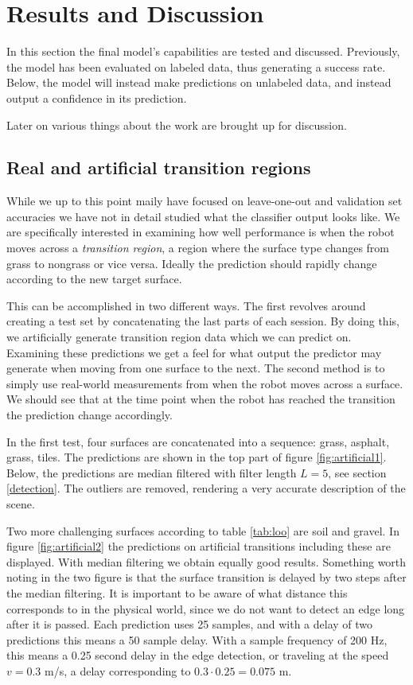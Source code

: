 \chapter{Results and Discussion}
In this section the final model's capabilities are tested and discussed. Previously, the model has been evaluated on labeled data, thus generating a success rate. Below, the model will instead make predictions on unlabeled data, and instead output a confidence in its prediction.

Later on various things about the work are brought up for discussion.

\section{Real and artificial transition regions}

While we up to this point maily have focused on leave-one-out and validation set accuracies we have not in detail studied what the classifier output looks like. We are specifically interested in examining how well performance is when the robot moves across a \emph{transition region}, a region where the surface type changes from grass to nongrass or vice versa. Ideally the prediction should rapidly change according to the new target surface. 

This can be accomplished in two different ways. The first revolves around creating a test set by concatenating the last parts of each session. By doing this, we artificially generate transition region data which we can predict on. Examining these predictions we get a feel for what output the predictor may generate when moving from one surface to the next. The second method is to simply use real-world measurements from when the robot moves across a surface. We should see that at the time point when the robot has reached the transition the prediction change accordingly. 

In the first test, four surfaces are concatenated into a sequence: grass, asphalt, grass, tiles. The predictions are shown in the top part of figure \ref{fig:artificial1}. Below, the predictions are median filtered with filter length $L=5$, see section \ref{detection}. The outliers are removed, rendering a very accurate description of the scene. 

Two more challenging surfaces according to table \ref{tab:loo} are soil and gravel. In figure \ref{fig:artificial2} the predictions on artificial transitions including these are displayed. With median filtering we obtain equally good results. Something worth noting in the two figure is that the surface transition is delayed by two steps after the median filtering. It is important to be aware of what distance this corresponds to in the physical world, since we do not want to detect an edge long after it is passed. Each prediction uses 25 samples, and with a delay of two predictions this means a 50 sample delay. With a sample frequency of 200 Hz, this means a 0.25 second delay in the edge detection, or traveling at the speed $v=0.3$ m/s, a delay corresponding to $0.3\cdot0.25=0.075$ m.

